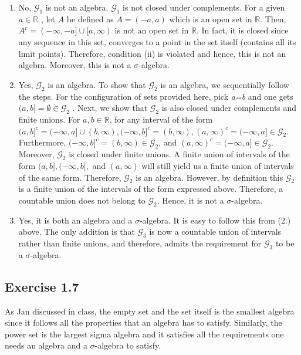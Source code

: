 \documentclass[12pt]{article}
\begin{document}
\begin{enumerate}
	\item No, $\mathcal{G}_1$ is not an algebra. $\mathcal{G}_1$ is not closed under complements. For a given $a \in \mathbb{R}$ , let $A$ be defined as $A = (-a, a)$ which is an open set in $\mathbb{R}$. Then,  $A^c = (-\infty,-a]\cup [a,\infty)$ is not an open set in $\mathbb{R}$. In fact, it is closed since any sequence in this set, converges to a point in the set itself (contains all its limit points). Therefore, condition (ii) is violated and hence, this is not an algebra. Moreover, this is not a $\sigma$-algebra.\\ \vskip 1cm
	
	
	\item Yes, $\mathcal{G}_2$ is an algebra. To show that $\mathcal{G}_2$ is an algebra, we sequentially follow the steps. For the configuration of sets provided here, pick \textit{a=b} and one gets  $(a,b] = \emptyset \in \mathcal{G}_2$ . Next, we show that  $\mathcal{G}_2$ is also closed under complements and finite unions. For $a, b \in \mathbb{R}$, for any interval of the form  $(a,b]^c = (-\infty, a] \cup (b, \infty), (-\infty, b]^c = (b, \infty),  (a, \infty)^c = (-\infty, a]  \in \mathcal{G}_2$. Furthermore, $(-\infty, b]^c = (b, \infty) \in \mathcal{G}_2$, and $(a, \infty)^c = (-\infty, a] \in \mathcal{G}_2$. Moreover, $\mathcal{G}_2$ is closed under finite unions. A finite union of intervals of the form $(a, b], (-\infty, b],$ and $(a, \infty)$ will still yield us a finite union of intervals of the same form. Therefore, $\mathcal{G}_2$ is an algebra. However, by definition this 
	$\mathcal{G}_2$ is a finite union of the intervals of the form expressed above. Therefore, a countable union does not belong to $\mathcal{G}_2$. Hence, it is not a $\sigma$-algebra.\vskip 1cm
	
	\item Yes, it is both an algebra and a $\sigma$-algebra. It is easy to follow this from (2.) above. The only addition is that $\mathcal{G}_3$ is now a countable union of intervals rather than finite unions, and therefore, admits the requirement for $\mathcal{G}_3$ to be a $\sigma$-algebra. 
	

\end{enumerate}


\subsection{Exercise 1.7}

As Jan discussed in class, the empty set and the set itself is the smallest algebra since it follows all the properties that an algebra has to satisfy. Similarly, the power set is the largest sigma algebra and it satisfies all the requirements one needs an algebra and a $\sigma$-algebra to satisfy.  \vskip 2cm
	
\end{document}
